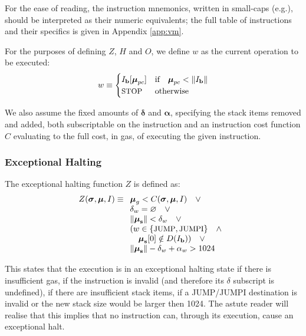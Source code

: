 \documentclass[9pt,oneside]{amsart}
\makeatletter
\newcommand*\eg{e.g.\@\xspace}
\makeatother
\begin{document}
\begin{multicols}{2}
For the ease of reading, the instruction mnemonics, written in small-caps (\eg {}), should be interpreted as their numeric equivalents; the full table of instructions and their specifics is given in Appendix \ref{app:vm}.

For the purposes of defining $Z$, $H$ and $O$, we define $w$ as the current operation to be executed:
\begin{equation}\label{eq:currentoperation}
w \equiv \begin{cases} I_\mathbf{b}[\boldsymbol{\mu}_{pc}] & \text{if} \quad \boldsymbol{\mu}_{pc} < \lVert I_\mathbf{b} \rVert \\
\text{\small STOP} & \text{otherwise}
\end{cases}
\end{equation}

We also assume the fixed amounts of $\mathbf{\delta}$ and $\mathbf{\alpha}$, specifying the stack items removed and added, both subscriptable on the instruction and an instruction cost function $C$ evaluating to the full cost, in gas, of executing the given instruction.

\subsubsection{Exceptional Halting}

The exceptional halting function $Z$ is defined as:
\begin{equation}
Z(\boldsymbol{\sigma}, \boldsymbol{\mu}, I) \equiv
\begin{array}[t]{l}
\boldsymbol{\mu}_g < C(\boldsymbol{\sigma}, \boldsymbol{\mu}, I) \quad \vee \\
\mathbf{\delta}_w = \varnothing \quad \vee \\
\lVert\boldsymbol{\mu}_\mathbf{s}\rVert < \mathbf{\delta}_w \quad \vee \\
( w \in \{ \text{\small JUMP}, \text{\small JUMPI} \} \quad \wedge \\ \quad \boldsymbol{\mu}_\mathbf{s}[0] \notin D(I_\mathbf{b}) ) \quad \vee \\
\lVert\boldsymbol{\mu}_\mathbf{s}\rVert - \mathbf{\delta}_w + \mathbf{\alpha}_w > 1024 \quad
\end{array}
\end{equation}

This states that the execution is in an exceptional halting state if there is insufficient gas, if the instruction is invalid (and therefore its $\delta$ subscript is undefined), if there are insufficient stack items, if a {\small JUMP}/{\small JUMPI} destination is invalid or the new stack size would be larger then 1024. The astute reader will realise that this implies that no instruction can, through its execution, cause an exceptional halt.


\end{multicols}
\end{document}
